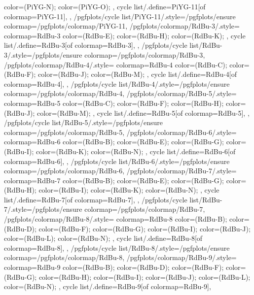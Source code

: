 {{{      color=(PiYG-N);
      color=(PiYG-O);
    },
    cycle list/.define={PiYG-11}{[of colormap=PiYG-11]},
  },
  /pgfplots/cycle list/PiYG-11/.style={/pgfplots/ensure colormap={/pgfplots/colormap/PiYG-11}},
  /pgfplots/colormap/RdBu-3/.style={
    colormap={RdBu-3}{
      color=(RdBu-E);
      color=(RdBu-H);
      color=(RdBu-K);
    },
    cycle list/.define={RdBu-3}{[of colormap=RdBu-3]},
  },
  /pgfplots/cycle list/RdBu-3/.style={/pgfplots/ensure colormap={/pgfplots/colormap/RdBu-3}},
  /pgfplots/colormap/RdBu-4/.style={
    colormap={RdBu-4}{
      color=(RdBu-C);
      color=(RdBu-F);
      color=(RdBu-J);
      color=(RdBu-M);
    },
    cycle list/.define={RdBu-4}{[of colormap=RdBu-4]},
  },
  /pgfplots/cycle list/RdBu-4/.style={/pgfplots/ensure colormap={/pgfplots/colormap/RdBu-4}},
  /pgfplots/colormap/RdBu-5/.style={
    colormap={RdBu-5}{
      color=(RdBu-C);
      color=(RdBu-F);
      color=(RdBu-H);
      color=(RdBu-J);
      color=(RdBu-M);
    },
    cycle list/.define={RdBu-5}{[of colormap=RdBu-5]},
  },
  /pgfplots/cycle list/RdBu-5/.style={/pgfplots/ensure colormap={/pgfplots/colormap/RdBu-5}},
  /pgfplots/colormap/RdBu-6/.style={
    colormap={RdBu-6}{
      color=(RdBu-B);
      color=(RdBu-E);
      color=(RdBu-G);
      color=(RdBu-I);
      color=(RdBu-K);
      color=(RdBu-N);
    },
    cycle list/.define={RdBu-6}{[of colormap=RdBu-6]},
  },
  /pgfplots/cycle list/RdBu-6/.style={/pgfplots/ensure colormap={/pgfplots/colormap/RdBu-6}},
  /pgfplots/colormap/RdBu-7/.style={
    colormap={RdBu-7}{
      color=(RdBu-B);
      color=(RdBu-E);
      color=(RdBu-G);
      color=(RdBu-H);
      color=(RdBu-I);
      color=(RdBu-K);
      color=(RdBu-N);
    },
    cycle list/.define={RdBu-7}{[of colormap=RdBu-7]},
  },
  /pgfplots/cycle list/RdBu-7/.style={/pgfplots/ensure colormap={/pgfplots/colormap/RdBu-7}},
  /pgfplots/colormap/RdBu-8/.style={
    colormap={RdBu-8}{
      color=(RdBu-B);
      color=(RdBu-D);
      color=(RdBu-F);
      color=(RdBu-G);
      color=(RdBu-I);
      color=(RdBu-J);
      color=(RdBu-L);
      color=(RdBu-N);
    },
    cycle list/.define={RdBu-8}{[of colormap=RdBu-8]},
  },
  /pgfplots/cycle list/RdBu-8/.style={/pgfplots/ensure colormap={/pgfplots/colormap/RdBu-8}},
  /pgfplots/colormap/RdBu-9/.style={
    colormap={RdBu-9}{
      color=(RdBu-B);
      color=(RdBu-D);
      color=(RdBu-F);
      color=(RdBu-G);
      color=(RdBu-H);
      color=(RdBu-I);
      color=(RdBu-J);
      color=(RdBu-L);
      color=(RdBu-N);
    },
    cycle list/.define={RdBu-9}{[of colormap=RdBu-9]},
}}
